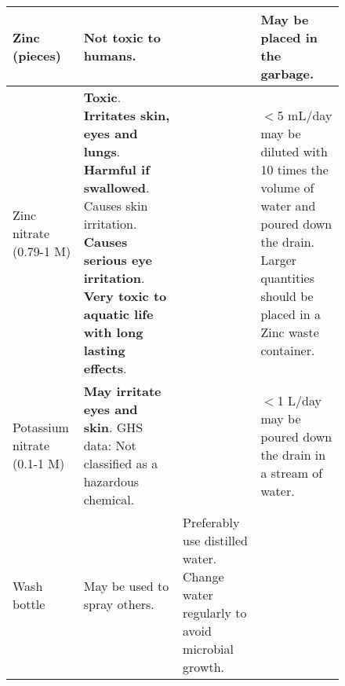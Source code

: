 \documentclass[11pt,a4paper]{article}
\begin{document}
\begin{figure}[]
\begin{tabular}{|p{3cm}|p{4cm}|p{4.5cm}|p{4cm}|}
		\hline
		Zinc (pieces) & Not toxic to humans. & & \textbf{May be placed in the garbage}. \\
		\hline
		Zinc nitrate (0.79-1 M) & \textbf{Toxic}. \textbf{Irritates skin, eyes and lungs}. \textbf{Harmful if swallowed}. Causes skin irritation. \textbf{Causes serious eye irritation}. \textbf{Very toxic to aquatic life with long lasting effects}. & & $<$5 mL/day may be diluted with 10 times the volume of water and poured down the drain. Larger quantities should be placed in a Zinc waste container. \\
		\hline
		Potassium nitrate (0.1-1 M) & \textbf{May irritate eyes and skin}. GHS data: Not classified as a hazardous chemical. & & $<$1 L/day may be poured down the drain in a stream of water. \\
		\hline
		Wash bottle & May be used to spray others. & Preferably use distilled water. Change water regularly to avoid microbial growth. & \\
		\hline
	\end{tabular}
\end{figure}
\normalsize
\end{document}
